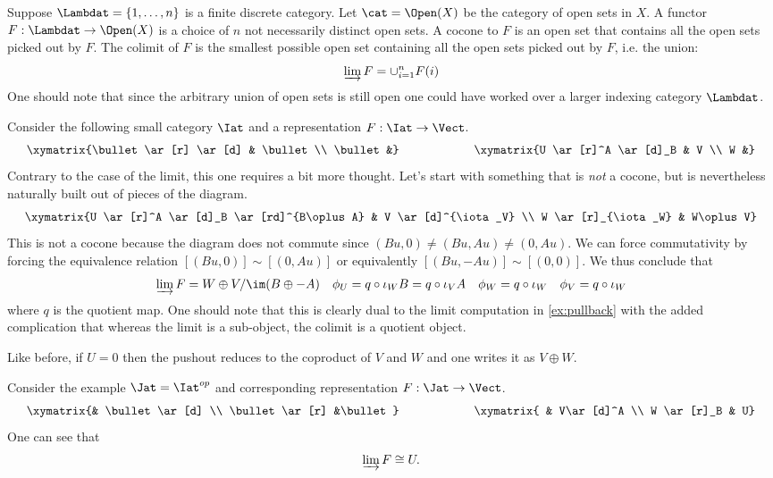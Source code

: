 \begin{ex}
	Suppose $\Lambdat=\{1,\ldots, n\}$ is a finite discrete category. Let $\cat=\Open(X)$ be the category of open sets in $X$. A functor $F:\Lambdat\to\Open(X)$ is a choice of $n$ not necessarily distinct open sets. A cocone to $F$ is an open set that contains all the open sets picked out by $F$. The colimit of $F$ is the smallest possible open set containing all the open sets picked out by $F$, i.e. the union: $$\varinjlim F=\cup_{i=1}^n F(i)$$
	One should note that since the arbitrary union of open sets is still open one could have worked over a larger indexing category $\Lambdat$.
\end{ex}

\begin{ex}[Pushouts]\label{ex:pushout}
	Consider the following small category $\Iat$ and a representation $F:\Iat\to\Vect$.
	\[
	\xymatrix{\bullet \ar[r] \ar[d] & \bullet \\ \bullet &}
	\qquad \qquad \qquad
	\xymatrix{U \ar[r]^A \ar[d]_B & V \\ W &}
	\]
	Contrary to the case of the limit, this one requires a bit more thought. Let's start with something that is \emph{not} a cocone, but is nevertheless naturally built out of pieces of the diagram.
	\[
	\xymatrix{U \ar[r]^A \ar[d]_B \ar[rd]^{B\oplus A} & V \ar[d]^{\iota_V} \\ W \ar[r]_{\iota_W} & W\oplus V}
	\]
	This is not a cocone because the diagram does not commute since $(Bu,0)\neq (Bu,Au)\neq (0,Au)$. We can force commutativity by forcing the equivalence relation $[(Bu,0)]\sim [(0,Au)]$ or equivalently $[(Bu,-Au)]\sim [(0,0)]$. We thus conclude that
	\[
	\varinjlim F=W\oplus V/\im(B\oplus -A) \quad \phi_U=q\circ \iota_WB=q\circ\iota_VA \quad \phi_W=q\circ \iota_W \quad \phi_V=q\circ \iota_W
	\]
	where $q$ is the quotient map. One should note that this is clearly dual to the limit computation in \ref{ex:pullback} with the added complication that whereas the limit is a sub-object, the colimit is a quotient object.
	
	Like before, if $U=0$ then the pushout reduces to the coproduct of $V$ and $W$ and one writes it as $V\oplus W$.
\end{ex}

\begin{ex}
	Consider the example $\Jat=\Iat^{op}$ and corresponding representation $F:\Jat\to\Vect$.
	\[
	\xymatrix{& \bullet\ar[d] \\ \bullet \ar[r] &\bullet}
	\qquad \qquad \qquad
	\xymatrix{ & V\ar[d]^A \\ W \ar[r]_B & U}
	\]
	One can see that
	\[
		\varinjlim F\cong U.
	\]
\end{ex}

